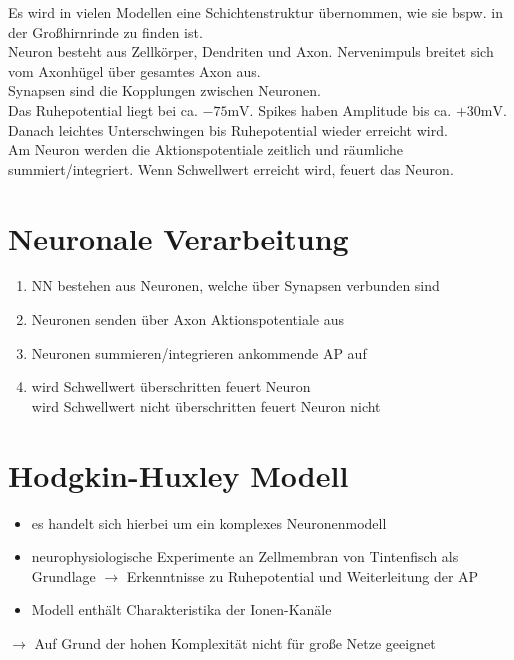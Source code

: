 Es wird in vielen Modellen eine Schichtenstruktur übernommen, wie sie bspw. in der Großhirnrinde zu finden ist.\\
Neuron besteht aus Zellkörper, Dendriten und Axon. Nervenimpuls breitet sich vom Axonhügel über gesamtes Axon aus.\\
Synapsen sind die Kopplungen zwischen Neuronen.\\
Das Ruhepotential liegt bei ca. $-75\si{\milli \volt}$. Spikes haben Amplitude bis ca. $+30\si{\milli \volt}$. Danach leichtes Unterschwingen bis Ruhepotential wieder erreicht wird.\\
Am Neuron werden die Aktionspotentiale zeitlich und räumliche summiert/integriert. Wenn Schwellwert erreicht wird, feuert das Neuron.

\section{Neuronale Verarbeitung}
\begin{enumerate}
    \item NN bestehen aus Neuronen, welche über Synapsen verbunden sind
    \item Neuronen senden über Axon Aktionspotentiale aus
    \item Neuronen summieren/integrieren ankommende AP auf
    \item wird Schwellwert überschritten feuert Neuron\\
        wird Schwellwert nicht überschritten feuert Neuron nicht
\end{enumerate}

\section{Hodgkin-Huxley Modell}
\begin{itemize}
    \item es handelt sich hierbei um ein komplexes Neuronenmodell
    \item neurophysiologische Experimente an Zellmembran von Tintenfisch als Grundlage $\rightarrow$ Erkenntnisse zu Ruhepotential und Weiterleitung der AP
    \item Modell enthält Charakteristika der Ionen-Kanäle
\end{itemize}
$\rightarrow$ Auf Grund der hohen Komplexität nicht für große Netze geeignet


